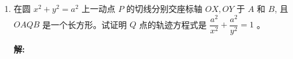 \documentclass[10pt]{article}
\newcommand{\sol}{\textbf{解:} }
\begin{document}
\begin{enumerate}[leftmargin=*]
        \sol{}
        \begin{align*}
          y                      & = x + b         \\
          m                      & = 1             \\
          x^{2} + x^{2}          & = 4             \\
          2x + 2y \dfrac{dy}{dx} & = 0             \\
          x + y \dfrac{dy}{dx}   & = 0             \\
          \dfrac{dy}{dx}         & = -\dfrac{x}{y} \\
          -\dfrac{x}{y}          & = 1             \\
          x                      & = -y
        \end{align*}
        代入圆的方程式得
        \begin{align*}
          (-y)^{2} + y^{2} & = 4            \\
          2y^{2}           & = 4            \\
          y^{2}            & = 2            \\
          y                & = \pm \sqrt{2}
        \end{align*}
        当 $y = \sqrt{2}$ 时，$x = -\sqrt{2}$, $b = \sqrt{2} + \sqrt{2} = 2\sqrt{2}$。

        当 $y = -\sqrt{2}$ 时，$x = \sqrt{2}$, $b = -\sqrt{2} - \sqrt{2} = -2\sqrt{2}$。

        $\therefore$ $b = \pm 2\sqrt{2}$。\hfill$\blacksquare$

        \newpage
  \item 在圆 $x^{2}+y^{2}=a^{2}$ 上一动点 $P$ 的切线分别交座标轴 $OX, OY$ 于 $A$ 和 $B$, 且 $OAQB$ 是一个长方形。试证明 $Q$ 点的轨迹方程式是 $\dfrac{a^{2}}{x^{2}}+\dfrac{a^{2}}{y^{2}}=1$ 。

        \sol{}


\end{enumerate}
\end{document}
